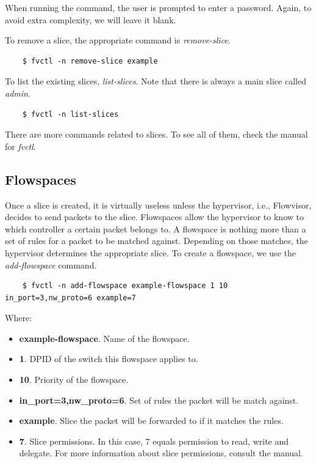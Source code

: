 When running the command, the user is prompted to enter a password. Again, to avoid extra complexity, we will leave it blank.

To remove a slice, the appropriate command is \textit{remove-slice}.
\begin{lstlisting}
    $ fvctl -n remove-slice example
\end{lstlisting}

To list the existing slices, \textit{list-slices}. Note that there is always a main slice called \textit{admin}.
\begin{lstlisting}
    $ fvctl -n list-slices
\end{lstlisting}

There are more commands related to slices. To see all of them, check the manual for \textit{fvctl}.

\subsection{Flowspaces}
Once a slice is created, it is virtually useless unless the hypervisor, i.e., Flowvisor, decides to send packets to the slice. Flowspaces allow the hypervisor to know to which controller a certain packet belongs to. A flowspace is nothing more than a set of rules for a packet to be matched against. Depending on those matches, the hypervisor determines the appropriate slice. To create a flowspace, we use the \textit{add-flowspace} command.
\begin{lstlisting}
    $ fvctl -n add-flowspace example-flowspace 1 10 in_port=3,nw_proto=6 example=7
\end{lstlisting}

Where:
\begin{itemize}
    \item \textbf{example-flowspace}. Name of the flowspace.
    \item \textbf{1}. DPID of the switch this flowspace applies to.
    \item \textbf{10}. Priority of the flowspace.
    \item \textbf{in\_port=3,nw\_proto=6}. Set of rules the packet will be match against.
    \item \textbf{example}. Slice the packet will be forwarded to if it matches the rules.
    \item \textbf{7}. Slice permissions. In this case, 7 equals permission to read, write and delegate. For more information about slice permissions, consult the manual.
\end{itemize}

